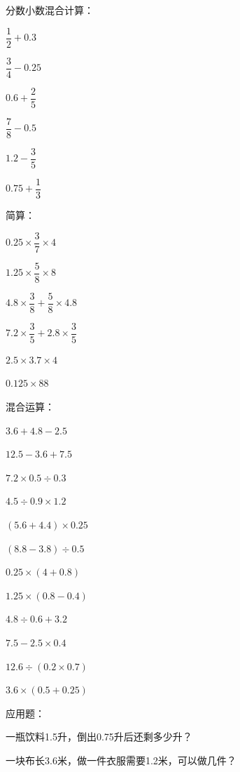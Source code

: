 \begin{exercise}
\item 分数小数混合计算：
  \begin{subexercise}
    \item $\dfrac{1}{2}+0.3$
    \item $\dfrac{3}{4}-0.25$
    \item $0.6+\dfrac{2}{5}$
    \item $\dfrac{7}{8}-0.5$
    \item $1.2-\dfrac{3}{5}$
    \item $0.75+\dfrac{1}{3}$
  \end{subexercise}

\item 简算：
  \begin{subexercise}
    \item $0.25\times\dfrac{3}{7}\times4$
    \item $1.25\times\dfrac{5}{8}\times8$
    \item $4.8\times\dfrac{3}{8}+\dfrac{5}{8}\times4.8$
    \item $7.2\times\dfrac{3}{5}+2.8\times\dfrac{3}{5}$
    \item $2.5\times3.7\times4$
    \item $0.125\times88$
  \end{subexercise}

\item 混合运算：
  \begin{subexercise}
    \item $3.6+4.8-2.5$
    \item $12.5-3.6+7.5$
    \item $7.2\times0.5\div0.3$
    \item $4.5\div0.9\times1.2$
    \item $(5.6+4.4)\times0.25$
    \item $(8.8-3.8)\div0.5$
    \item $0.25\times(4+0.8)$
    \item $1.25\times(0.8-0.4)$
    \item $4.8\div0.6+3.2$
    \item $7.5-2.5\times0.4$
    \item $12.6\div(0.2\times0.7)$
    \item $3.6\times(0.5+0.25)$
  \end{subexercise}

\item 应用题：
  \begin{subexercise}
    \item 一瓶饮料1.5升，倒出0.75升后还剩多少升？
    \item 一块布长3.6米，做一件衣服需要1.2米，可以做几件？
  \end{subexercise}
\end{exercise}

